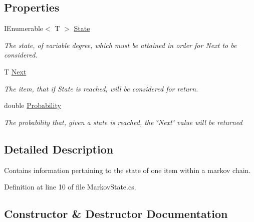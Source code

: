 \subsection*{Properties}
\begin{DoxyCompactItemize}
\item 
I\+Enumerable$<$ T $>$ \hyperlink{classHumDrum_1_1Collections_1_1Markov_1_1MarkovState_a6af42036b04d84e26d06ee5d86790094}{State}
\begin{DoxyCompactList}\small\item\em The state, of variable degree, which must be attained in order for Next to be considered. \end{DoxyCompactList}\item 
T \hyperlink{classHumDrum_1_1Collections_1_1Markov_1_1MarkovState_a825a800c1e4b27746aeb672b49e0b57b}{Next}
\begin{DoxyCompactList}\small\item\em The item, that if State is reached, will be considered for return. \end{DoxyCompactList}\item 
double \hyperlink{classHumDrum_1_1Collections_1_1Markov_1_1MarkovState_afd0a085ed23c8922067ac105af054c34}{Probability}
\begin{DoxyCompactList}\small\item\em The probability that, given a state is reached, the \char`\"{}\+Next\char`\"{} value will be returned \end{DoxyCompactList}\end{DoxyCompactItemize}


\subsection{Detailed Description}
Contains information pertaining to the state of one item within a markov chain. 



Definition at line 10 of file Markov\+State.\+cs.



\subsection{Constructor \& Destructor Documentation}
